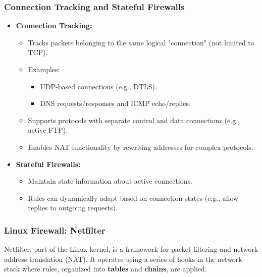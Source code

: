 \subsubsection{Connection Tracking and Stateful Firewalls}
\begin{itemize}
    \item \textbf{Connection Tracking:}
    \begin{itemize}
        \item Tracks packets belonging to the same logical "connection" (not limited to TCP).
        \item Examples:
        \begin{itemize}
            \item UDP-based connections (e.g., DTLS).
            \item DNS requests/responses and ICMP echo/replies.
        \end{itemize}
        \item Supports protocols with separate control and data connections (e.g., active FTP).
        \item Enables NAT functionality by rewriting addresses for complex protocols.
    \end{itemize}
    
    \item \textbf{Stateful Firewalls:}
    \begin{itemize}
        \item Maintain state information about active connections.
        \item Rules can dynamically adapt based on connection states (e.g., allow replies to outgoing requests).
    \end{itemize}
\end{itemize}

\subsubsection{Linux Firewall: Netfilter}
Netfilter, part of the Linux kernel, is a framework for packet filtering and network address translation (NAT). It operates using a series of hooks in the network stack where rules, organized into \textbf{tables} and \textbf{chains}, are applied.
